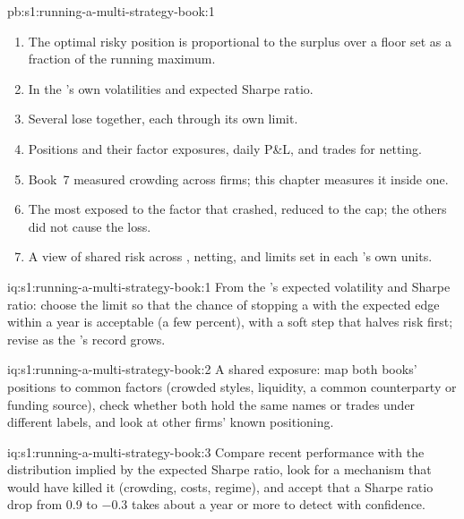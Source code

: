 \begin{solution}{pb:s1:running-a-multi-strategy-book:1}
\begin{enumerate}
\item The optimal risky position is proportional to the surplus over a floor set as a fraction of the running maximum.
\item In the 's own volatilities and expected Sharpe ratio.
\item Several  lose together, each through its own limit.
\item Positions and their factor exposures, daily P\&L, and trades for netting.
\item Book~7 measured crowding across firms; this chapter measures it inside one.
\item The  most exposed to the factor that crashed, reduced to the cap; the others did not cause the loss.
\item A view of shared risk across , netting, and limits set in each 's own units.
\end{enumerate}
\end{solution}

\begin{solution}{iq:s1:running-a-multi-strategy-book:1}
From the 's expected volatility and Sharpe ratio: choose the limit so that the chance of stopping a  with the expected edge within a year is
acceptable (a few percent), with a soft step that halves risk first; revise as the 's record grows.
\end{solution}

\begin{solution}{iq:s1:running-a-multi-strategy-book:2}
A shared exposure: map both books' positions to common factors (crowded styles, liquidity, a common counterparty or funding source), check whether both
hold the same names or trades under different labels, and look at other firms' known positioning.
\end{solution}

\begin{solution}{iq:s1:running-a-multi-strategy-book:3}
Compare recent performance with the distribution implied by the expected Sharpe ratio, look for a mechanism that would have killed it (crowding, costs,
regime), and accept that a Sharpe ratio drop from 0.9 to $-0.3$ takes about a year or more to detect with confidence.
\end{solution}

